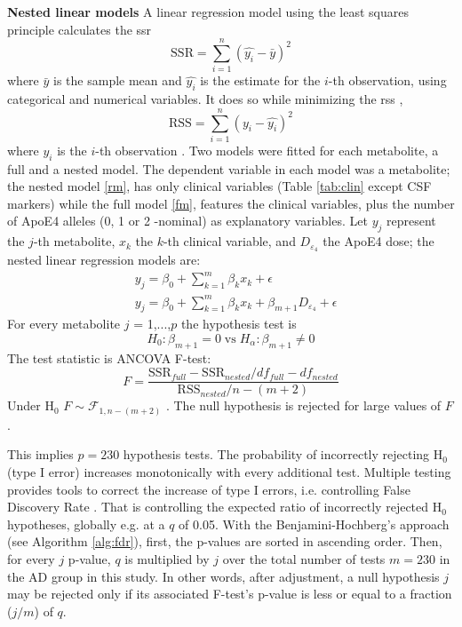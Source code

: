 \documentclass{amsart}
\begin{document}
\leavevmode\newline \textbf{Nested linear models}\hspace{.25cm}
A linear regression model using the least squares principle calculates the \acrfull{ssr}
$$\mathrm{SSR} = \sum_{i=1}^{n} (\hat{y_i}-\bar{y})^2$$ where $\bar{y}$ is the sample mean and $\hat{y_i}$ is the estimate for the $i$-th observation, using categorical and numerical variables. It does so while minimizing the \acrfull{rss} \cite{ott2015introduction}, 
$$\mathrm{RSS} = \sum_{i=1}^{n} (y_i - \hat{y_i})^2$$ where $y_i$ is the $i$-th observation \cite{ott2015introduction}. Two models were fitted for each metabolite, a full and a nested model. The dependent variable in each model was a metabolite; the nested model \eqref{rm}, has only clinical variables (Table \ref{tab:clin} except CSF markers) while the full model \eqref{fm}, features the clinical variables, plus the number of ApoE4 alleles (0, 1 or 2 -nominal) as explanatory variables. Let $y_j$ represent the $j$-th metabolite, $x_k$ the $k$-th clinical variable, and $D_{\varepsilon_4}$ the ApoE4 dose; the nested linear regression models are:
\begin{align}
    & y_j = \beta_0 + \sum_{k=1}^m\beta_kx_k +\epsilon \label{rm} \\
    & y_j = \beta_0 + \sum_{k=1}^m\beta_kx_k + \beta_{m+1}D_{\varepsilon_4} + \epsilon \label{fm}
\end{align}
For every metabolite $j$ = 1,...,$p$ the hypothesis test is 
\[H_0: \beta_{m+1} = 0 \; \mathrm{vs} \; H_\alpha: \beta_{m+1} \neq 0\]
The test statistic is ANCOVA F-test:
\[ F = \frac{\mathrm{SSR}_{full}-\mathrm{SSR}_{nested}/df_{full}-df_{nested}}{\mathrm{RSS}_{nested}/n-(m+2)}\]
Under H$_0$ $F \sim \mathcal{F}_{1, n-(m+2)}$ \cite{ott2015introduction}. The null hypothesis is rejected for large values of $F$.

This implies $p = 230$ hypothesis tests. The probability of incorrectly rejecting H$_0$ (type I error) increases monotonically with every additional test. Multiple testing provides tools to correct the increase of type I errors, i.e. controlling False Discovery Rate \cite{Benjamini1995ControllingTesting}. That is controlling the expected ratio of incorrectly rejected H$_0$ hypotheses, globally e.g. at a $q$ of 0.05. With the Benjamini-Hochberg's approach (see Algorithm \ref{alg:fdr}), first, the p-values are sorted in ascending order. Then, for every $j$ p-value, $q$ is multiplied by $j$ over the total number of tests \cite{Benjamini1995ControllingTesting} $m=230$ in the AD group in this study. In other words, after adjustment, a null hypothesis $j$ may be rejected only if its associated F-test's p-value is less or equal to a fraction ($j/m$) of $q$.
\end{document}
